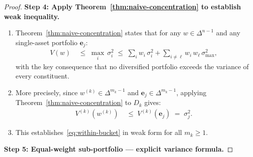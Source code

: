 \documentclass[12pt,openany]{book}
\newcommand{\bfw}{\mathbf{w}}
\newcommand{\bfe}{\mathbf{e}}
\newcommand{\calD}{\mathcal{D}}
\numberwithin{equation}{chapter}
\theoremstyle{plain}
\theoremstyle{definition}
\theoremstyle{remark}
\def\calD{D}%
\def\mathcal#1{#1}%
\def\bfw{w}%
\begin{document}
\begin{proof}
\medskip
\noindent\textbf{Step 4: Apply Theorem~\ref{thm:naive-concentration}
to establish weak inequality.}

\begin{enumerate}
  \item Theorem~\ref{thm:naive-concentration} states that for any
        $\bfw \in \Delta^{n-1}$ and any single-asset portfolio
        $\bfe_j$:
        \begin{align}
          V(\bfw) &\;\leq\; \max_{i}\,\sigma_i^2
                   \;\leq\; \sum_{i} w_i\,\sigma_i^2
                            + \sum_{i \neq \ell} w_i\,w_\ell\,\sigma_{\max}^2,
        \end{align}
        with the key consequence that no diversified portfolio
        exceeds the variance of every constituent.
  \item More precisely, since $\bfw^{(k)} \in \Delta^{m_k - 1}$
        and $\bfe_j \in \Delta^{m_k - 1}$, applying
        Theorem~\ref{thm:naive-concentration} to $\calD_k$ gives:
        \begin{align}
          V^{(k)}(\bfw^{(k)})
          &\;\leq\; V^{(k)}(\bfe_j)
           \;=\; \sigma_j^2.
          \label{eq:weak-ineq}
        \end{align}
  \item This establishes~\eqref{eq:within-bucket} in weak form for
        all $m_k \geq 1$.
\end{enumerate}

\medskip
\noindent\textbf{Step 5: Equal-weight sub-portfolio --- explicit
variance formula.}


\end{proof}
\end{document}
